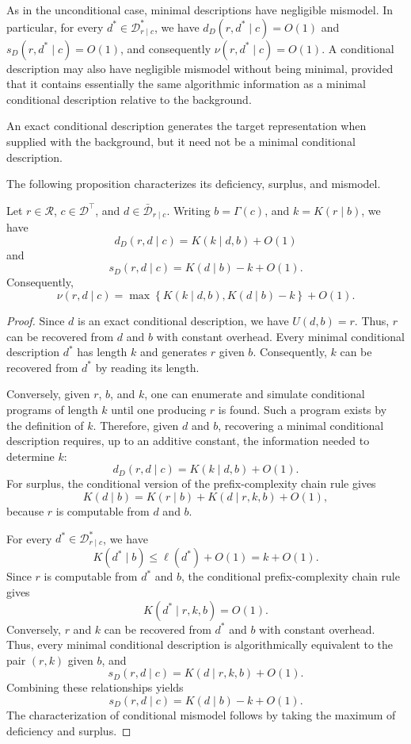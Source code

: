 As in the unconditional case, minimal descriptions have negligible mismodel. In particular, for every
$d^\ast\in\mathcal D_{r\mid c}^\ast$, we have $d_D(r,d^\ast\mid c)=O(1)$ and $s_D(r,d^\ast\mid c)=O(1)$, and consequently $\nu(r,d^\ast\mid c)=O(1)$. A conditional description may also have negligible mismodel without being minimal, provided that it contains essentially the same algorithmic information as a minimal conditional description relative to the background.

An exact conditional description generates the target representation when supplied with the background, but it need not be a minimal conditional description.

The following proposition characterizes its deficiency, surplus, and mismodel.

\begin{proposition}
\label{prop:exact_conditional_mismodel}
Let $r\in\mathcal R$, $c\in\mathcal D^\top$, and $d\in\bar{\mathcal D}_{r\mid c}$. Writing $b=\Gamma(c)$,
and $k=K(r\mid b)$, we have
\[
d_D(r,d\mid c) = K(k\mid d,b)+O(1)
\]
and
\[
s_D(r,d\mid c) = K(d\mid b)-k+O(1).
\]
Consequently,
\[
\nu(r,d\mid c) = \max\left\{K(k\mid d,b), K(d\mid b)-k \right\} +O(1).
\]
\end{proposition}
\begin{proof}
Since $d$ is an exact conditional description, we have $U(d,b)=r$. Thus, $r$ can be recovered from $d$ and $b$
with constant overhead. Every minimal conditional description $d^\ast$ has length $k$ and generates $r$ given $b$. Consequently, $k$ can be recovered from $d^\ast$ by reading its length.

Conversely, given $r$, $b$, and $k$, one can enumerate and simulate conditional programs of length $k$ until one producing $r$ is found. Such a program exists by the definition of $k$. Therefore, given $d$ and $b$, recovering a minimal conditional description requires, up to an additive constant, the information needed
to determine $k$:
\[
d_D(r,d\mid c)=K(k\mid d,b)+O(1).
\]
For surplus, the conditional version of the prefix-complexity chain rule gives
\[
K(d\mid b) = K(r\mid b) + K(d\mid r,k,b) + O(1),
\]
because $r$ is computable from $d$ and $b$.

For every $d^\ast\in\mathcal D_{r\mid c}^\ast$, we have
\[
K(d^\ast\mid b)\le\ell(d^\ast)+O(1)=k+O(1).
\]
Since $r$ is computable from $d^\ast$ and $b$, the conditional prefix-complexity chain rule gives
\[
K(d^\ast\mid r,k,b)=O(1).
\]
Conversely, $r$ and $k$ can be recovered from $d^\ast$ and $b$ with constant overhead. Thus, every minimal conditional description is algorithmically equivalent to the pair $(r,k)$ given $b$, and
\[
s_D(r,d\mid c)=K(d\mid r,k,b)+O(1).
\]
Combining these relationships yields
\[
s_D(r,d\mid c) = K(d\mid b)-k+O(1).
\]
The characterization of conditional mismodel follows by taking the maximum of deficiency and surplus.
\end{proof}

